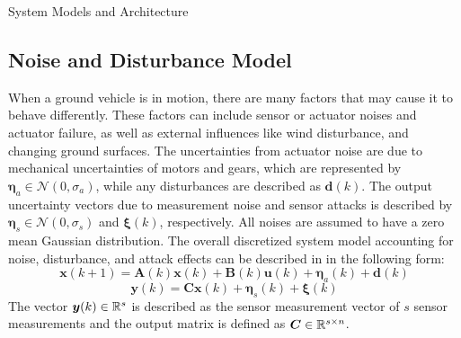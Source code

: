 \begin{section}{System Models and Architecture}
 \subsection{Noise and Disturbance Model}
When a ground vehicle is in motion, there are many factors that may cause it to behave differently. These factors can include sensor or actuator noises and actuator failure, as well as external influences like wind disturbance, and changing ground surfaces. The uncertainties from actuator noise are due to mechanical uncertainties of motors and gears, which are represented by $ \bm{\eta}_a \in \mathcal{N}(0,\sigma_a) $, while any disturbances are described as $\bm{d}(k)$. The output uncertainty vectors due to measurement noise and sensor attacks is described by $ \bm{\eta}_s \in \mathcal{N}(0,\sigma_s) $ and $\bm{\xi}(k)$, respectively. All noises are assumed to have a zero mean Gaussian distribution. The overall discretized system model accounting for noise, disturbance, and attack effects  can be described in in the following form:
    \begin{equation}
	\bm{x}(k+1)=\bm{A}(k)\bm{x}(k)+\bm{B}(k)\bm{u}(k)+\bm{\eta}_a(k)+\bm{d}(k)
	\end{equation}
	\begin{equation}
	\bm{y}(k)=\bm{C}\bm{x}(k)+\bm{\eta}_s(k)+\bm{\xi}(k)
	\end{equation}
The vector $\bm{y}(k) \in \mathbb{R}^{s}$ is described as the sensor measurement vector of $s$ sensor measurements and the output matrix is defined as $\bm{C} \in \mathbb{R}^{s\times n}$.  

\end{section}
